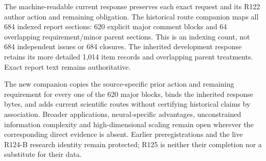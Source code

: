 The machine-readable current response preserves each exact request and its
R122 author action and remaining obligation. The historical route companion
maps all 684 indexed report sections: 620 explicit major comment blocks and
64 overlapping requirement/minor parent sections. This is an indexing
count, not 684 independent issues or 684 closures. The inherited development
response retains its more detailed 1,014 item records and overlapping parent
treatments. Exact report text remains authoritative.

The new companion copies the source-specific prior action and remaining
requirement for every one of the 620 major blocks, binds the inherited
response bytes, and adds current scientific routes without certifying
historical claims by association. Broader applications, neural-specific
advantages, unconstrained information complexity and high-dimensional
scaling remain open wherever the corresponding direct evidence is absent.
Earlier preregistrations and the live R124-B research identity remain
protected; R125 is neither their completion nor a substitute for their data.

